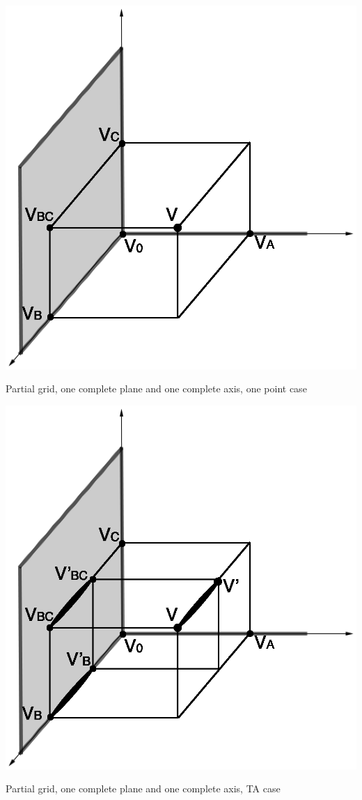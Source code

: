 \begin{multicols}{2}
{\begin{figurehere}
\begin{center}
\includegraphics[scale=0.40]{Interpolation-PLAX-INS.eps}
\caption{Partial grid, one complete plane and one complete axis, one point case}
\label{figNCRPLAXINS}
\end{center}
\end{figurehere}

\begin{figurehere}
\begin{center}
\includegraphics[scale=0.40]{Interpolation-PLAX-TA.eps}
\caption{Partial grid, one complete plane and one complete axis, TA case}
\label{figNCRPLAXTA}
\end{center}
\end{figurehere}

}
\end{multicols}
